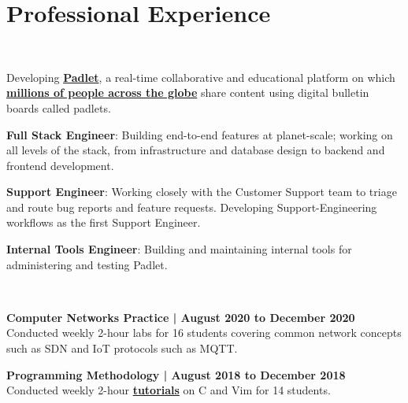 \documentclass[a4paper]{resume-template} %
\begin{document}
\begin{minipage}[t]{0.60\textwidth} 


\section{Professional Experience}
\\
\vspace{10pt} %
\begin{tightemize}
\item Developing {\bf \href{https://padlet.com/}{Padlet}}, a real-time collaborative and educational platform on which {\bf \href{https://www.alexa.com/siteinfo/padlet.com}{millions of people across the globe}} share content using digital bulletin boards called padlets.
\item {\fontsize{10}{10}\selectfont\bfseries Full Stack Engineer}: Building end-to-end features at planet-scale; working on all levels of the stack, from infrastructure and database design to backend and frontend development.
\item {\fontsize{10}{10}\selectfont\bfseries Support Engineer}: Working closely with the Customer Support team to triage and route bug reports and feature requests. Developing Support-Engineering workflows as the first Support Engineer.
\item {\fontsize{10}{10}\selectfont\bfseries Internal Tools Engineer}: Building and maintaining internal tools for administering and testing Padlet.
\end{tightemize}
\sectionsep
{}\\
\begin{tightemize}
\item {\fontsize{10}{10}\selectfont\bfseries Computer Networks Practice | August 2020 to December 2020}\\ Conducted weekly 2-hour labs for 16 students covering common network concepts such as SDN and IoT protocols such as MQTT.
\item {\fontsize{10}{10}\selectfont\bfseries Programming Methodology | August 2018 to December 2018}\\ Conducted weekly 2-hour {\bf \href{https://github.com/DigiPie/CS1010-Tutorial-C09}{tutorials}} on C and Vim for 14 students.

\end{tightemize}
\end{minipage}
\end{document}
